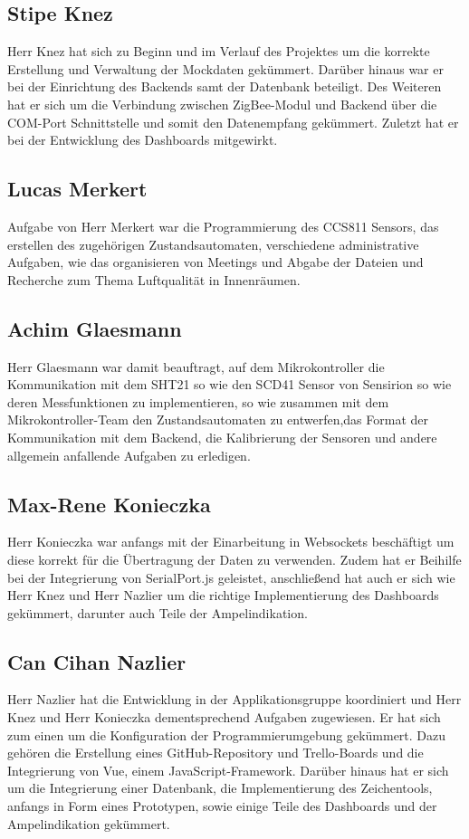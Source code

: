 \documentclass[]{article}
\begin{document}
		\subsection{Stipe Knez}
			Herr Knez hat sich zu Beginn und im Verlauf des Projektes um die korrekte Erstellung und Verwaltung der Mockdaten gekümmert. Darüber hinaus war er bei der Einrichtung des Backends samt der Datenbank beteiligt. Des Weiteren hat er sich um die Verbindung zwischen ZigBee-Modul und Backend über die COM-Port Schnittstelle und somit den Datenempfang gekümmert. Zuletzt hat er bei der Entwicklung des Dashboards mitgewirkt. 
		\subsection{Lucas Merkert}
			Aufgabe von Herr Merkert war die Programmierung des CCS811 Sensors, das erstellen des zugehörigen Zustandsautomaten, verschiedene administrative Aufgaben, wie das organisieren von Meetings und Abgabe der Dateien und Recherche zum Thema Luftqualität in Innenräumen.
		\subsection{Achim Glaesmann}
			Herr Glaesmann war damit beauftragt, auf dem Mikrokontroller die Kommunikation mit dem SHT21 so wie den SCD41 Sensor von Sensirion so wie deren Messfunktionen zu implementieren, so wie zusammen mit dem Mikrokontroller-Team den Zustandsautomaten zu entwerfen,das Format der Kommunikation mit dem Backend, die Kalibrierung der Sensoren und andere allgemein anfallende Aufgaben zu erledigen.
		\subsection{Max-Rene Konieczka}
			Herr Konieczka war anfangs mit der Einarbeitung in Websockets beschäftigt um diese korrekt für die Übertragung der Daten zu verwenden. Zudem hat er Beihilfe bei der Integrierung von SerialPort.js geleistet, anschließend hat auch er sich wie Herr Knez und Herr Nazlier um die richtige Implementierung des Dashboards gekümmert, darunter auch Teile der Ampelindikation. 
		\subsection{Can Cihan Nazlier}
			Herr Nazlier hat die Entwicklung in der Applikationsgruppe koordiniert und Herr Knez und Herr Konieczka dementsprechend Aufgaben zugewiesen. Er hat sich zum einen um die Konfiguration der Programmierumgebung gekümmert. Dazu gehören die Erstellung eines GitHub-Repository und Trello-Boards und die Integrierung von Vue, einem JavaScript-Framework. Darüber hinaus hat er sich um die Integrierung einer Datenbank, die Implementierung des Zeichentools, anfangs in Form eines Prototypen, sowie einige Teile des Dashboards und der Ampelindikation gekümmert.
			\newpage
		
\end{document}
